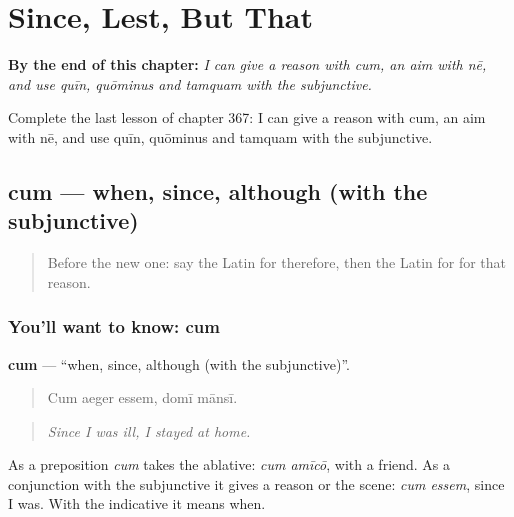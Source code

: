 
\chapter{Since, Lest, But That}
\label{ch:la-since-lest-but-that}

\begin{chapteropening}
\textbf{By the end of this chapter:} \emph{I can give a reason with cum, an aim with nē, and use quīn, quōminus and tamquam with the subjunctive.}

Complete the last lesson of chapter 367: I can give a reason with cum, an aim with nē, and use quīn, quōminus and tamquam with the subjunctive.
\end{chapteropening}

\section[cum]{cum — when, since, although (with the subjunctive)}

\label{lesson:LA-C367-cum}



\begin{quote}
Before the new one: say the Latin for therefore, then the Latin for for that reason.
\end{quote}

\subsection*{You'll want to know: cum}
\textbf{cum} — \textquotedblleft{}when, since, although (with the subjunctive)\textquotedblright{}.

\begin{quote}
Cum aeger essem, domī mānsī.
\end{quote}

\begin{quote}
\emph{Since I was ill, I stayed at home.}
\end{quote}

As a preposition \emph{cum} takes the ablative: \emph{cum amīcō}, with a friend. As a conjunction with the subjunctive it gives a reason or the scene: \emph{cum essem}, since I was. With the indicative it means when.

